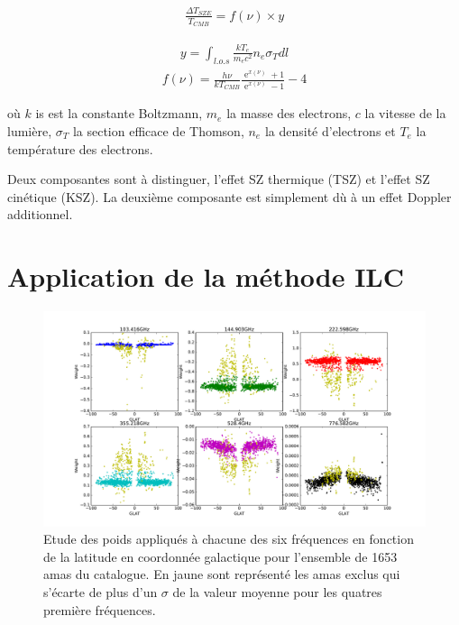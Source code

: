 \documentclass[a4paper,11pt]{article}
\DeclareMathOperator{\e}{e}
\begin{document}
\begin{align*}
  \frac{\Delta T_{SZE}}{T_{CMB}} = f(\nu) \times  y
\end{align*}

\begin{multicols}{2}\noindent
\begin{align*}
  y = \int_{l.o.s} \frac{kT_e}{m_e c^2} n_e \sigma_T dl 
\end{align*}
\begin{align*}
  f(\nu) = \frac{h \nu}{k T_{CMB}} \frac{\e^{x(\nu)}+1}{\e^{x(\nu)}-1} - 4
\end{align*}
\end{multicols}

où $k$ is est la constante Boltzmann, $m_e$ la masse des electrons, $c$
la vitesse de la lumière, $\sigma_T$ la section efficace de Thomson, 
$n_e$ la densité d'electrons et $T_e$ la température des electrons.

Deux composantes sont à distinguer, l'effet SZ thermique (TSZ) et
l'effet SZ cinétique (KSZ). La deuxième composante est simplement dù à un effet
Doppler additionnel. 

\section{Application de la méthode ILC}

\begin{figure}[b!]
  \centering
  \label{w_lat}
  \includegraphics[width=6in]{w_lat.pdf}
  \caption{Etude des poids appliqués à chacune des six fréquences en
    fonction de la latitude en coordonnée galactique pour
  l'ensemble de 1653 amas du catalogue. En jaune sont représenté les
  amas exclus qui s'écarte de plus d'un $\sigma$ de la valeur moyenne
  pour les quatres première fréquences.}
\end{figure}
\end{document}
